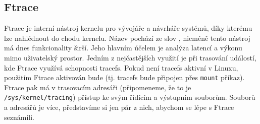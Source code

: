 \subsection{Ftrace}
\label{Ftrace}

Ftrace je interní nástroj kernelu pro vývojáře a návrháře systémů, díky kterému lze nahlédnout do chodu kernelu. Název pochází ze slov , nicméně tento nástroj má dnes funkcionality širší. Jeho hlavním účelem je analýza latencí a výkonu mimo uživatelský prostor. Jedním z nejčastějších využití je při trasování událostí, kde Ftrace využívá schopnosti tracefs. Pokud není tracefs aktivní v Linuxu, použitím Ftrace aktivován bude (tj. tracefs bude připojen přes \texttt{mount} příkaz). Ftrace pak má v trasovacím adresáři (připomeneme, že to je \texttt{/sys/kernel/tracing}) přístup ke svým řídícím a výstupním souborům. Souborů a adresářů je více, představíme si jen pár z nich, abychom se lépe s Ftrace seznámili.
